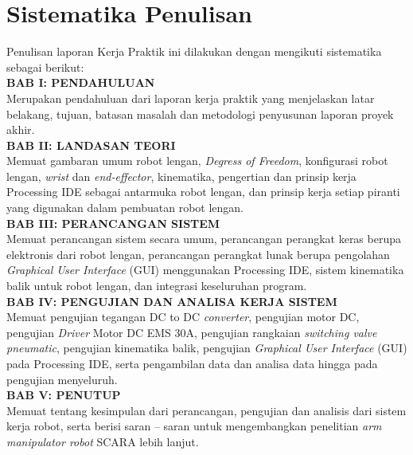 \section{Sistematika Penulisan}
Penulisan laporan Kerja Praktik ini dilakukan dengan mengikuti sistematika sebagai berikut:\\
\noindent
\textbf{BAB I\hspace*{0.6cm}: PENDAHULUAN}\\
\noindent
Merupakan pendahuluan dari laporan kerja praktik yang menjelaskan latar belakang, tujuan, batasan masalah dan metodologi penyusunan laporan proyek akhir.\\
\noindent
\textbf{BAB II\hspace*{0.5cm}: LANDASAN TEORI}\\
\noindent
Memuat gambaran umum robot lengan, \emph {Degress of Freedom}, konfigurasi robot lengan, \emph{wrist} dan \textit{end-effector}, kinematika, pengertian dan prinsip kerja Processing IDE sebagai antarmuka robot lengan, dan prinsip kerja setiap piranti yang digunakan dalam pembuatan robot lengan. \\
\textbf{BAB III\hspace*{0.375cm}:  PERANCANGAN SISTEM}\\
\noindent
Memuat perancangan sistem secara umum, perancangan perangkat keras berupa elektronis dari robot lengan, perancangan perangkat lunak berupa pengolahan \textit{Graphical User Interface} (GUI) menggunakan Processing IDE, sistem kinematika balik untuk robot lengan, dan integrasi keseluruhan program. \\
\textbf{BAB IV\hspace*{0.4cm}:  PENGUJIAN DAN ANALISA KERJA SISTEM }\\
\noindent
Memuat pengujian tegangan DC to DC \textit{converter}, pengujian motor DC, pengujian \textit{Driver} Motor DC EMS 30A, pengujian rangkaian \textit{switching valve pneumatic}, pengujian kinematika balik, pengujian \textit{Graphical User Interface} (GUI) pada Processing IDE, serta pengambilan data dan analisa data hingga pada pengujian menyeluruh.\\
\textbf{BAB V\hspace*{0.6cm}: PENUTUP}\\
Memuat tentang kesimpulan dari perancangan, pengujian dan analisis dari sistem kerja robot, serta berisi saran – saran untuk mengembangkan penelitian \emph{ arm manipulator robot} SCARA lebih lanjut. \\